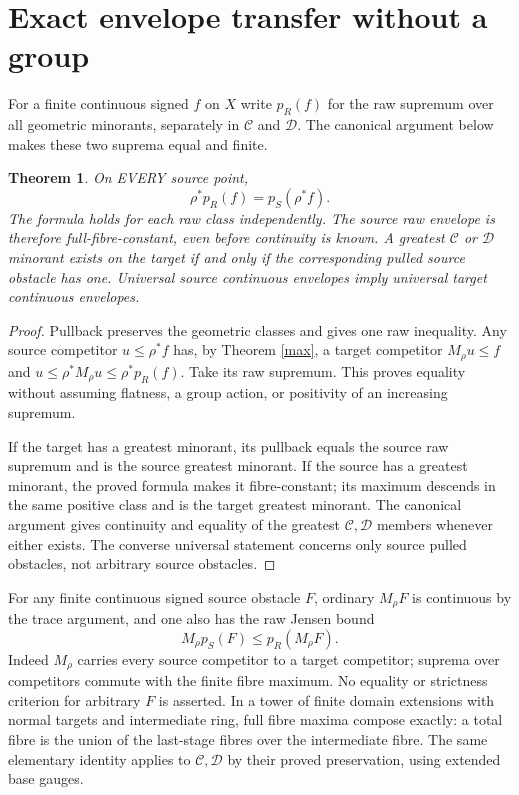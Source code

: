 \documentclass[11pt]{article}
\newtheorem{theorem}{Theorem}
\newcommand{\C}{\mathcal C}
\newcommand{\D}{\mathcal D}
\begin{document}
\section{Exact envelope transfer without a group}
For a finite continuous signed $f$ on $X$ write $p_R(f)$ for the raw
supremum over all geometric minorants, separately in $\C$ and $\D$.
The canonical argument below makes these two suprema equal and finite.
\begin{theorem}\label{env}
On EVERY source point,
\[
 \rho^*p_R(f)=p_S(\rho^*f).
\]
The formula holds for each raw class independently. The source raw
envelope is therefore full-fibre-constant, even before continuity is known.
A greatest $\C$ or $\D$ minorant exists on the target if and only if the
corresponding pulled source obstacle has one. Universal source continuous
envelopes imply universal target continuous envelopes.
\end{theorem}
\begin{proof}
Pullback preserves the geometric classes and gives one raw inequality.
Any source competitor $u\le\rho^*f$ has, by Theorem \ref{max},
a target competitor $M_\rho u\le f$ and
$u\le\rho^*M_\rho u\le\rho^*p_R(f)$. Take its raw supremum.
This proves equality without assuming flatness, a group action, or
positivity of an increasing supremum.

If the target has a greatest minorant, its pullback equals the source raw
supremum and is the source greatest minorant.
If the source has a greatest minorant, the proved formula makes it
fibre-constant; its maximum descends in the same positive class and is
the target greatest minorant. The canonical argument gives continuity
and equality of the greatest $\C,\D$ members whenever either exists.
The converse universal statement concerns only source pulled obstacles,
not arbitrary source obstacles.
\end{proof}

For any finite continuous signed source obstacle $F$, ordinary $M_\rho F$
is continuous by the trace argument, and one also has the raw Jensen bound
\[
 M_\rho p_S(F)\le p_R(M_\rho F).
\]
Indeed $M_\rho$ carries every source competitor to a target competitor;
suprema over competitors commute with the finite fibre maximum.
No equality or strictness criterion for arbitrary $F$ is asserted.
In a tower of finite domain extensions with normal targets and intermediate
ring, full fibre maxima compose exactly: a total fibre is the union of the
last-stage fibres over the intermediate fibre. The same elementary identity
applies to $\C,\D$ by their proved preservation, using extended base gauges.
\end{document}

